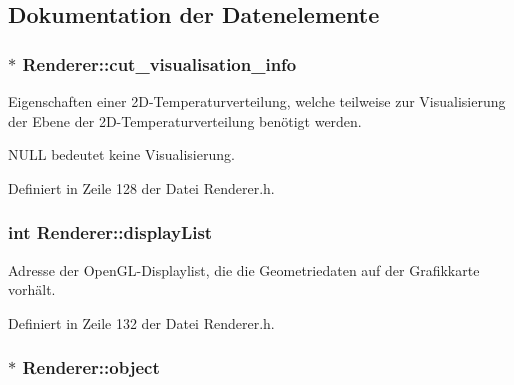 \subsection{Dokumentation der Datenelemente}
\hypertarget{classRenderer_a119b7d1e3eb740a118e269758dd1a906}{
\subsubsection[{cut\-\_\-visualisation\-\_\-info}]{$\ast$ Renderer\-::cut\-\_\-visualisation\-\_\-info\hspace{0.3cm}{\ttfamily [private]}}}\label{classRenderer_a119b7d1e3eb740a118e269758dd1a906}


Eigenschaften einer 2\-D-\/\-Temperaturverteilung, welche teilweise zur Visualisierung der Ebene der 2\-D-\/\-Temperaturverteilung benötigt werden. 

N\-U\-L\-L bedeutet keine Visualisierung. 

Definiert in Zeile 128 der Datei Renderer.\-h.

\hypertarget{classRenderer_a165ec913fa058d0a38f5e7b7635adfd2}{
\subsubsection[{display\-List}]{\setlength{\rightskip}{0pt plus 5cm}int Renderer\-::display\-List\hspace{0.3cm}{\ttfamily [private]}}}\label{classRenderer_a165ec913fa058d0a38f5e7b7635adfd2}


Adresse der Open\-G\-L-\/\-Displaylist, die die Geometriedaten auf der Grafikkarte vorhält. 



Definiert in Zeile 132 der Datei Renderer.\-h.

\hypertarget{classRenderer_a4ad4a42fe6bfd32ff3ef4bb1d59f8f96}{
\subsubsection[{object}]{$\ast$ Renderer\-::object\hspace{0.3cm}{\ttfamily [private]}}}\label{classRenderer_a4ad4a42fe6bfd32ff3ef4bb1d59f8f96}


